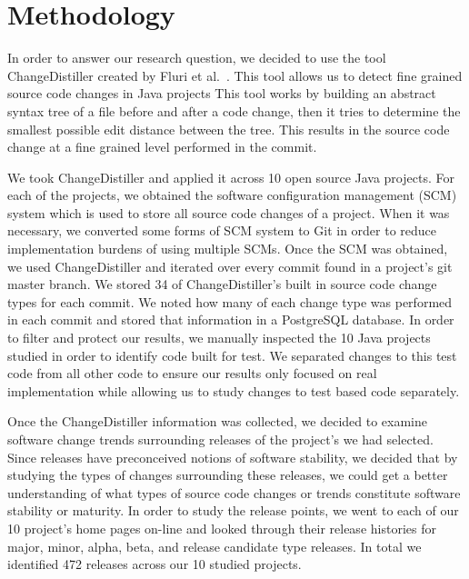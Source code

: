 \documentclass[conference]{IEEEtran}
\begin{document}
\section{Methodology}
\label{sec:meth}
In order to answer our research question, we decided to use the tool ChangeDistiller created by Fluri et al.~\cite{Fluri:2007:CDT}. This tool allows us to detect fine grained
source code changes in Java projects This tool works by building an abstract syntax tree of a file before and after a code change, then it tries to determine
the smallest possible edit distance between the tree. This results in the source code change at a fine grained level performed in the commit.

We took ChangeDistiller and applied it across 10 open source Java projects. For each of the projects, we obtained the software configuration management (SCM) system
which is used to store all source code changes of a project. When it was necessary, we converted some forms of SCM system to Git in order to reduce implementation
burdens of using multiple SCMs. Once the SCM was obtained, we used ChangeDistiller and iterated over every commit found in a project's git master branch. We stored
34 of ChangeDistiller's built in source code change types for each commit. We noted how many of each change type was performed in each commit and stored that information
in a PostgreSQL database. In order to filter and protect our results, we manually inspected the 10 Java projects studied in order to identify code built for test.
We separated changes to this test code from all other code to ensure our results only focused on real implementation while allowing us to study changes to
test based code separately.

Once the ChangeDistiller information was collected, we decided to examine software change trends surrounding releases of the project's we had selected. Since releases
have preconceived notions of software stability, we decided that by studying the types of changes surrounding these releases, we could get a better understanding of
what types of source code changes or trends constitute software stability or maturity. In order to study the release points, we went to each of our 10 project's 
home pages on-line and looked through their release histories for major, minor, alpha, beta, and release candidate type releases. In total we identified 472 releases
across our 10 studied projects.  
\end{document}
